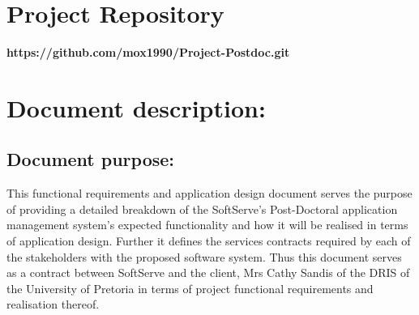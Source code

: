 \documentclass[12pt]{article}
\newcommand{\repo}{https://github.com/mox1990/Project-Postdoc.git}
\begin{document}
\listoffigures
\newpage
\section{Project Repository}
\textbf{\repo}
\newpage
\section{Document description:}

\subsection{Document purpose:}
\vspace{0.2in}
This functional requirements and application design document serves the purpose of providing a detailed breakdown of the SoftServe's Post-Doctoral application management system's expected functionality and how it will be realised in terms of application design. Further it defines the services contracts required by each of the stakeholders with the proposed software system. Thus this document serves as a contract between SoftServe and the client, Mrs Cathy Sandis of the DRIS of the University of Pretoria in terms of project functional requirements and realisation thereof.

\vspace{0.2in}
\end{document}
